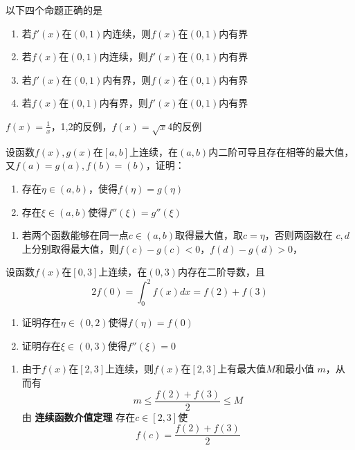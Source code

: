 \documentclass{article}
\begin{document}
\begin{examplle}[]
以下四个命题正确的是
\begin{enumerate}
\item 若\(f'(x)\)在\((0,1)\)内连续，则\(f(x)\)在\((0,1)\)内有界
\item 若\(f(x)\)在\((0,1)\)内连续，则\(f'(x)\)在\((0,1)\)内有界
\item 若\(f'(x)\)在\((0,1)\)内有界，则\(f(x)\)在\((0,1)\)内有界
\item 若\(f(x)\)在\((0,1)\)内有界，则\(f'(x)\)在\((0,1)\)内有界
\end{enumerate}


\(f(x)=\frac{1}{x}\)，1,2的反例，\(f(x)=\sqrt{x}\)4的反例
\end{examplle}

\begin{examplle}[]
设函数\(f(x),g(x)\)在\([a,b]\)上连续，在\((a,b)\)内二阶可导且存在相等的最大值，
又\(f(a)=g(a),f(b)=(b)\)，证明：
\begin{enumerate}
\item 存在\(\eta\in(a,b)\)，使得\(f(\eta)=g(\eta)\)
\item 存在\(\xi\in(a,b)\)使得\(f''(\xi)=g''(\xi)\)
\end{enumerate}


\begin{enumerate}
\item 若两个函数能够在同一点\(c\in(a,b)\)取得最大值，取\(c=\eta\)，否则两函数在
\(c,d\)上分别取得最大值，则\(f(c)-g(c)<0\)，\(f(d)-g(d)>0\)，
\end{enumerate}
\end{examplle}

\begin{examplle}[]
设函数\(f(x)\)在\([0,3]\)上连续，在\((0,3)\)内存在二阶导数，且
\begin{equation*}
2f(0)=\int_0^2f(x)dx=f(2)+f(3)
\end{equation*}
\begin{enumerate}
\item 证明存在\(\eta\in(0,2)\)使得\(f(\eta)=f(0)\)
\item 证明存在\(\xi\in(0,3)\)使得\(f''(\xi)=0\)
\end{enumerate}


\begin{enumerate}
\item 由于\(f(x)\)在\([2,3]\)上连续，则\(f(x)\)在\([2,3]\)上有最大值\(M\)和最小值
\(m\)，从而有
\begin{equation*}
m\le\frac{f(2)+f(3)}{2}\le M
\end{equation*}
由 \textbf{连续函数介值定理} 存在\(c\in[2,3]\)使
\begin{equation*}
f(c)=\frac{f(2)+f(3)}{2}
\end{equation*}
\end{enumerate}
\end{examplle}
\end{document}
